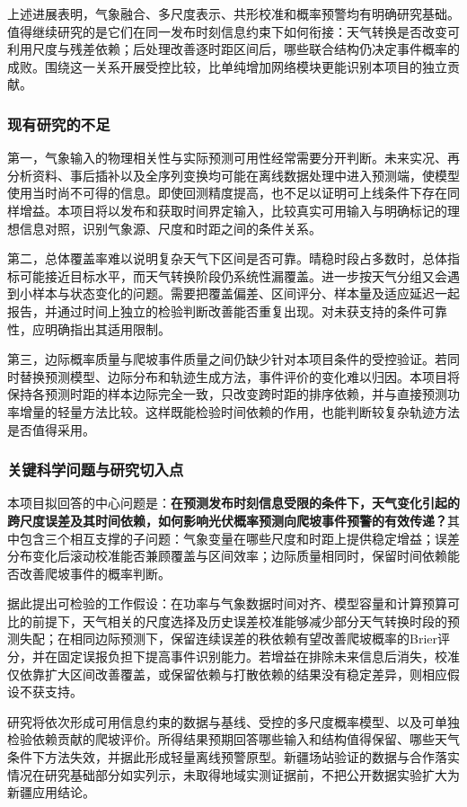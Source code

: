 上述进展表明，气象融合、多尺度表示、共形校准和概率预警均有明确研究基础。值得继续研究的是它们在同一发布时刻信息约束下如何衔接：天气转换是否改变可利用尺度与残差依赖；后处理改善逐时距区间后，哪些联合结构仍决定事件概率的成败。围绕这一关系开展受控比较，比单纯增加网络模块更能识别本项目的独立贡献。

\subsubsection{现有研究的不足}
第一，气象输入的物理相关性与实际预测可用性经常需要分开判断。未来实况、再分析资料、事后插补以及全序列变换均可能在离线数据处理中进入预测端，使模型使用当时尚不可得的信息。即使回测精度提高，也不足以证明可上线条件下存在同样增益。本项目将以发布和获取时间界定输入，比较真实可用输入与明确标记的理想信息对照，识别气象源、尺度和时距之间的条件关系。

第二，总体覆盖率难以说明复杂天气下区间是否可靠。晴稳时段占多数时，总体指标可能接近目标水平，而天气转换阶段仍系统性漏覆盖。进一步按天气分组又会遇到小样本与状态变化的问题。需要把覆盖偏差、区间评分、样本量及适应延迟一起报告，并通过时间上独立的检验判断改善能否重复出现。对未获支持的条件可靠性，应明确指出其适用限制。

第三，边际概率质量与爬坡事件质量之间仍缺少针对本项目条件的受控验证。若同时替换预测模型、边际分布和轨迹生成方法，事件评价的变化难以归因。本项目将保持各预测时距的样本边际完全一致，只改变跨时距的排序依赖，并与直接预测功率增量的轻量方法比较。这样既能检验时间依赖的作用，也能判断较复杂轨迹方法是否值得采用。

\subsubsection{关键科学问题与研究切入点}
本项目拟回答的中心问题是：\textbf{在预测发布时刻信息受限的条件下，天气变化引起的跨尺度误差及其时间依赖，如何影响光伏概率预测向爬坡事件预警的有效传递？}其中包含三个相互支撑的子问题：气象变量在哪些尺度和时距上提供稳定增益；误差分布变化后滚动校准能否兼顾覆盖与区间效率；边际质量相同时，保留时间依赖能否改善爬坡事件的概率判断。

据此提出可检验的工作假设：在功率与气象数据时间对齐、模型容量和计算预算可比的前提下，天气相关的尺度选择及历史误差校准能够减少部分天气转换时段的预测失配；在相同边际预测下，保留连续误差的秩依赖有望改善爬坡概率的Brier评分，并在固定误报负担下提高事件识别能力。若增益在排除未来信息后消失，校准仅依靠扩大区间改善覆盖，或保留依赖与打散依赖的结果没有稳定差异，则相应假设不获支持。

研究将依次形成可用信息约束的数据与基线、受控的多尺度概率模型、以及可单独检验依赖贡献的爬坡评价。所得结果预期回答哪些输入和结构值得保留、哪些天气条件下方法失效，并据此形成轻量离线预警原型。新疆场站验证的数据与合作落实情况在研究基础部分如实列示，未取得地域实测证据前，不把公开数据实验扩大为新疆应用结论。
